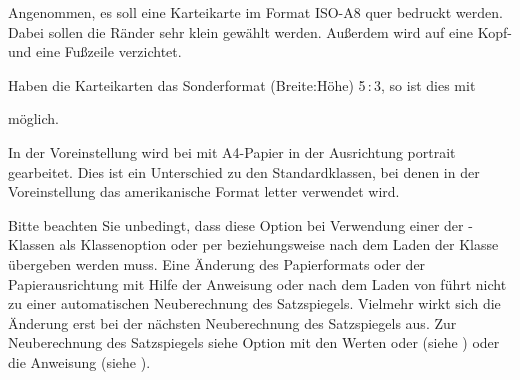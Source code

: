 \begin{Example}
  Angenommen, es soll eine Karteikarte im Format ISO-A8 quer bedruckt
  werden. Dabei sollen die Ränder sehr klein gewählt werden. Außerdem
  wird auf eine Kopf- und eine Fußzeile verzichtet.
  Haben die Karteikarten das Sonderformat (Breite:Höhe)
  5\,:\,3, so ist dies mit
  möglich.
\end{Example}

In der Voreinstellung wird bei \KOMAScript{} mit A4-Papier in der Ausrichtung
portrait gearbeitet. Dies ist ein Unterschied zu den Standardklassen, bei denen in der Voreinstellung
das amerikanische Format letter verwendet wird.

Bitte beachten Sie unbedingt, dass diese Option bei
Verwendung einer der \KOMAScript-Klassen als Klassenoption oder per
 beziehungsweise
 nach dem Laden der Klasse übergeben werden
muss.  Eine Änderung des Papierformats oder der Papierausrichtung mit Hilfe
der Anweisung  oder  nach dem Laden von
 führt nicht zu einer automatischen Neuberechnung des
Satzspiegels. Vielmehr wirkt sich die Änderung erst bei der nächsten
Neuberechnung des Satzspiegels aus. Zur Neuberechnung des Satzspiegels siehe
Option \hyperref[desc:\LabelBase.option.DIV.last]{} mit den Werten
\hyperref[desc:\LabelBase.option.DIV.last]{} oder
\hyperref[desc:\LabelBase.option.DIV.current]{} (siehe
) oder die Anweisung
 (siehe
).%
\EndIndexGroup


